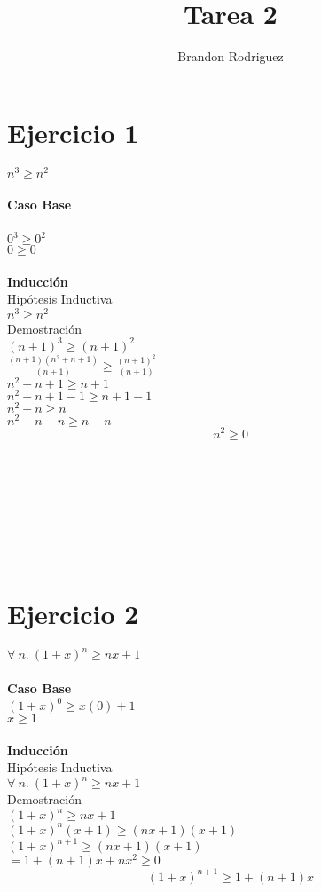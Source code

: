 \documentclass[14pt]{article}
\author{Brandon Rodriguez}
\title{Tarea 2}
\begin{document}
\maketitle
\section{Ejercicio 1}
 $ n^3  \geq  n^ 2 $
\\
\\
 \textbf{Caso Base}
\\
\\
$ 0^3 \geq 0^2 $
\\
$ 0 \geq 0 $
\\
\\
 \textbf{Inducción}
\\

Hipótesis Inductiva
\\
$ n^3  \geq  n^ 2 $
\\

Demostración
\\
$ (n+1)^3 \geq (n+1)^2 $
\\
$\frac { (n+1)(n^2+n+1)} {(n+1)} \geq \frac {(n+1)^2 } {(n+1)} $
\\
$ n^2+n+1 \geq n+1  $
\\
$ n^2+n+1-1 \geq n+1-1  $
\\
$ n^2+n \geq n  $
\\
$   n^2+n-n \geq n-n    $
\\
$$ n^2 \geq 0  $$
\\
\\
\\
\\
\\
\\
\\

\section{Ejercicio 2}

$\forall\ n.\ (1+x)^n\geq nx+1$
\\
\\
\textbf{Caso Base}
\\
$ (1+x)^0 \geq x(0)+1 $
\\
$ x \geq 1 $
\\
\\
\textbf{Inducción}
\\

Hipótesis Inductiva
\\
$\forall\ n.\ (1+x)^n\geq nx+1$
\\

Demostración 
\\ 
$(1+x)^n\geq nx+1$
\\
$(1+x)^n(x+1)\geq (nx+1)(x+1)$
\\
$(1+x)^{n+1}\geq (nx+1)(x+1)$
\\
$=1+(n+1)x+nx^2 \geq 0$
\\
$$(1+x)^{n+1}\geq 1+(n+1)x$$
\end{document}
